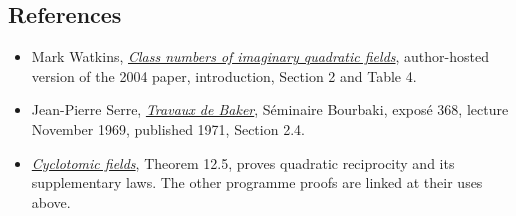 \documentclass[
  11pt,
  a4paper,
]{article}
\providecommand{\tightlist}{%
  \setlength{\itemsep}{0pt}\setlength{\parskip}{0pt}}
\begin{document}
\subsection{References}\label{references}

\begin{itemize}
\tightlist
\item
  Mark Watkins,
  \href{https://magma.maths.usyd.edu.au/~watkins/papers/smallcn.pdf}{\emph{Class
  numbers of imaginary quadratic fields}}, author-hosted version of the
  2004 paper, introduction, Section 2 and Table 4.
\item
  Jean-Pierre Serre,
  \href{https://numdam.org/item/SB_1969-1970__12__73_0.pdf}{\emph{Travaux
  de Baker}}, Séminaire Bourbaki, exposé 368, lecture November 1969,
  published 1971, Section 2.4.
\item
  \href{https://kokunoyumeto.github.io/open-math-courses-public/courses/NT-ANT/cyclotomic-fields.html}{\emph{Cyclotomic fields}},
  Theorem 12.5, proves quadratic reciprocity and its supplementary laws.
  The other programme proofs are linked at their uses above.
\end{itemize}
\end{document}
